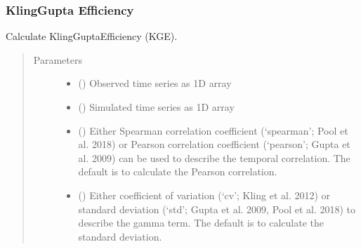 \documentclass[letterpaper,10pt,english]{sphinxmanual}
\begin{document}
\subsubsection{Kling\sphinxhyphen{}Gupta Efficiency}
\label{\detokenize{reference/kge:kling-gupta-efficiency}}

\begin{fulllineitems}
\label{\detokenize{reference/kge:de.kge.calc_kge}}
Calculate Kling\sphinxhyphen{}Gupta\sphinxhyphen{}Efficiency (KGE).
\begin{quote}\begin{description}
\item[{Parameters}] \leavevmode\begin{itemize}
\item {} 
 (\sphinxstyleliteralemphasis{\sphinxupquote{(}}\sphinxstyleliteralemphasis{\sphinxupquote{,}}\sphinxstyleliteralemphasis{\sphinxupquote{)}}) \textendash{} Observed time series as 1\sphinxhyphen{}D array

\item {} 
 (\sphinxstyleliteralemphasis{\sphinxupquote{(}}\sphinxstyleliteralemphasis{\sphinxupquote{,}}\sphinxstyleliteralemphasis{\sphinxupquote{)}}) \textendash{} Simulated time series as 1\sphinxhyphen{}D array

\item {} 
 (\sphinxstyleliteralemphasis{\sphinxupquote{, }}) \textendash{} Either Spearman correlation coefficient (‘spearman’; Pool et al. 2018)
or Pearson correlation coefficient (‘pearson’; Gupta et al. 2009) can
be used to describe the temporal correlation. The default is to
calculate the Pearson correlation.

\item {} 
 (\sphinxstyleliteralemphasis{\sphinxupquote{, }}) \textendash{} Either coefficient of variation (‘cv’; Kling et al. 2012) or standard
deviation (‘std’; Gupta et al. 2009, Pool et al. 2018) to describe the
gamma term. The default is to calculate the standard deviation.


\end{itemize}
\end{description}
\end{quote}
\end{fulllineitems}
\end{document}
